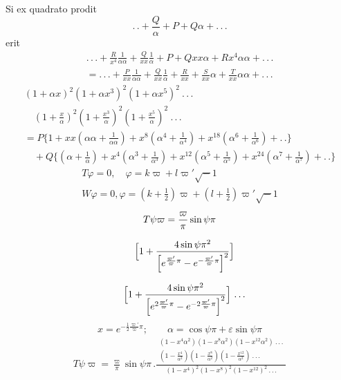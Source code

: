 \noindent Si ex quadrato prodit
\[
.\,.+\frac{Q}{\alpha}+P+Q\alpha+ .\,.\,.
\]
\noindent erit
\[
\begin{gathered}
.\,.\,.+\frac{R}{x^{4}}\frac1{\alpha\alpha}+\frac{Q}{xx}\frac1\alpha
+P+Qxx\alpha+Rx^{4}\alpha\alpha+ .\,.\,.
\\[7pt]
=.\,.\,.+\frac{P}{xx}\frac1{\alpha\alpha}+\frac{Q}{xx}\frac1\alpha
+\frac{R}{xx}+\frac{S}{xx}\alpha+\frac{T}{xx}\alpha\alpha+ .\,.\,.
\end{gathered}
\]
\[
\begin{gathered}
(1+\alpha x)^{2}(1+\alpha x^{3})^{2}(1+\alpha x^{5})^{2}\ .\,.\,.
\\[7pt]\quad{}(1+\tfrac{x}{\alpha})^{2}(1+\tfrac{x^{3}}{\alpha})^{2}(1+\tfrac{x^{5}}{\alpha})^{2}\ .\,.\,.
\\[7pt]
=P\{1+xx(\alpha\alpha+\tfrac1{\alpha\alpha})
+x^{8}(\alpha^{4}+\tfrac1{\alpha^{4}})
+x^{18}(\alpha^{6}+\tfrac1{\alpha^{6}})+ .\,.\}
\\[7pt]
\quad+Q\{(\alpha+\tfrac1\alpha)
+x^{4}(\alpha^{3}+\tfrac1{\alpha^{3}})
+x^{12}(\alpha^{5}+\tfrac1{\alpha^{5}})
+x^{24}(\alpha^{7}+\tfrac1{\alpha^{7}})+ .\,.\}
\end{gathered}
\]
\[
\begin{gathered}
T\varphi=0,\quad \varphi=k\varpi+l\varpi'\surd-1
\\[7pt]
W\varphi=0, \varphi=(k+\tfrac12)\varpi+(l+\tfrac12)\varpi'\surd-1
\end{gathered}
\]
\[
\begin{gathered}T\psi\varpi=\frac{\varpi}{\pi}\sin\psi\pi
\\[7pt]\quad{}\Bigl[1+\frac{4\sin\psi\pi^{2}}
{\Bigl[e^{\frac{\varpi'}{\varpi}\pi}-e^{-\frac{\varpi'}{\varpi}\pi}\Bigr]^{2}}\Bigr]
\\[7pt]\quad{}\Bigl[1+\frac{4\sin\psi\pi^{2}}
{\Bigl[e^{2\frac{\varpi'}{\varpi}\pi}-e^{-2\frac{\varpi'}{\varpi}\pi}\Bigr]^{2}}\Bigr]\ .\,.\,.\end{gathered}
\]
\[
x=e^{-\frac12\frac{\varpi'}{\varpi}\pi};\qquad
\alpha=\cos\psi\pi+\varepsilon\sin\psi\pi
\]
\[
\begin{gathered}T\psi\varpi=\frac{\varpi}{\pi}\sin\psi\pi\,.
\frac{\begin{gathered}(1-x^{4}\alpha^{2})(1-x^{8}\alpha^{2})(1-x^{12}\alpha^{2})\ .\,.\,.
\\[5pt](1-\frac{x^{4}}{\alpha^{2}})(1-\frac{x^{8}}{\alpha^{2}})(1-\frac{x^{12}}{\alpha^{2}})\ .\,.\,.\end{gathered}}
{(1-x^{4})^{2}(1-x^{8})^{2}(1-x^{12})^{2}\ .\,.\,.}\end{gathered}
\]
